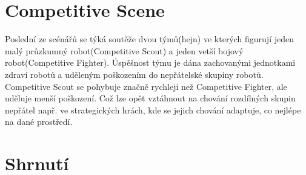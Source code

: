 \section{Competitive Scene}
Poslední ze scénářů se týká soutěže dvou týmů(hejn) ve kterých figurují jeden malý průzkumný robot(Competitive Scout) a jeden vetší bojový robot(Competitive Fighter). Úspěšnost týmu je dána zachovanými jednotkami zdraví robotů a uděleným poškozením do nepřátelské skupiny robotů. Competitive Scout se pohybuje značně rychleji než Competitive Fighter, ale uděluje menší poškození. Což lze opět vztáhnout na chování rozdílných skupin nepřátel např. ve strategických hrách, kde se jejich chování adaptuje, co nejlépe na dané prostředí. 
\section{Shrnutí}